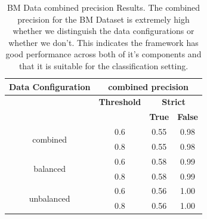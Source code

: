 \documentclass{mpaper}
\begin{document}
\begin{table}[]
\centering
\begin{tabular}{|c|ccc|}
\hline
\textbf{Data Configuration} & \multicolumn{3}{c|}{\textbf{combined precision}}                                              \\ \hline
                              & \multicolumn{1}{c|}{\textbf{Threshold}} & \multicolumn{2}{c|}{\textbf{Strict}}                \\ \cline{2-4} 
                              & \multicolumn{1}{c|}{\textbf{}}          & \textbf{True} & \multicolumn{1}{l|}{\textbf{False}} \\ \hline
\multirow{2}{*}{combined}     & \multicolumn{1}{c|}{0.6}                & 0.55          & 0.98                                \\
                              & \multicolumn{1}{c|}{0.8}                & 0.55          & 0.98                                \\ \hline
\multirow{2}{*}{balanced}     & \multicolumn{1}{c|}{0.6}                & 0.58          & 0.99                                \\
                              & \multicolumn{1}{c|}{0.8}                & 0.58          & 0.99                                \\ \hline
\multirow{2}{*}{unbalanced}   & \multicolumn{1}{c|}{0.6}                & 0.56          & 1.00                                \\
                              & \multicolumn{1}{c|}{0.8}                & 0.56          & 1.00                                \\ \hline
\end{tabular}
\caption{\label{tab:bm_combined_precision}BM Data combined precision Results. The combined precision for the BM Dataset is extremely high whether we distinguish the data configurations or whether we don't. This indicates the framework has good performance across both of it's components and that it is suitable for the classification setting. }
\end{table}
\end{document}
